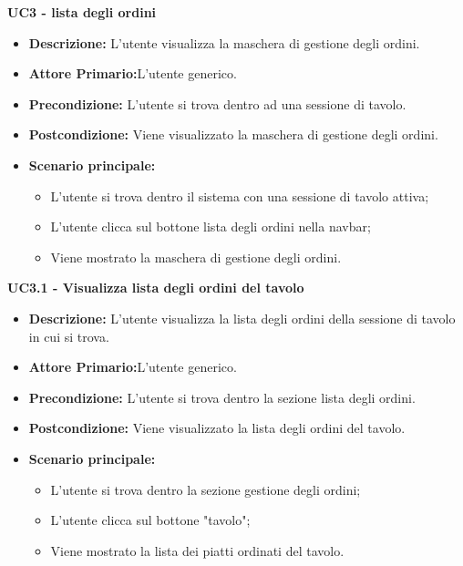 \textbf{UC3 - lista degli ordini}
\begin{itemize}
    \item \textbf{Descrizione:} L'utente visualizza la maschera di gestione degli ordini.
    \item \textbf{Attore Primario:}L'utente generico.
    \item \textbf{Precondizione:} L'utente si trova dentro ad una sessione di tavolo.
    \item \textbf{Postcondizione:} Viene visualizzato la maschera di gestione degli ordini.
    \item \textbf{Scenario principale:}
    \begin{itemize}
        \item L'utente si trova dentro il sistema con una sessione di tavolo attiva;
        \item L'utente clicca sul bottone lista degli ordini nella navbar;
        \item Viene mostrato la maschera di gestione degli ordini.
    \end{itemize}
\end{itemize}
\textbf{UC3.1 - Visualizza lista degli ordini del tavolo}
\begin{itemize}
    \item \textbf{Descrizione:} L'utente visualizza la lista degli ordini della sessione di tavolo in cui si trova. 
    \item \textbf{Attore Primario:}L'utente generico.
    \item \textbf{Precondizione:} L'utente si trova dentro la sezione lista degli ordini.
    \item \textbf{Postcondizione:} Viene visualizzato la lista degli ordini del tavolo.
    \item \textbf{Scenario principale:}
    \begin{itemize}
        \item L'utente si trova dentro la sezione gestione degli ordini;
        \item L'utente clicca sul bottone "tavolo";
        \item Viene mostrato la lista dei piatti ordinati del tavolo.
    \end{itemize}
\end{itemize}
